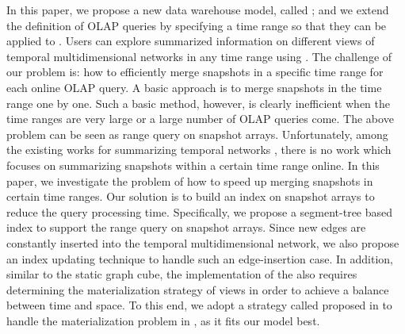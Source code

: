 \documentclass[10pt,journal,compsoc]{IEEEtran}
\begin{document}
In this paper, we propose a new data warehouse model, called   ; and we extend the definition of OLAP queries by specifying a time range so that they can be applied to   . Users can explore summarized information on different views of temporal multidimensional networks in any time range using   . The challenge of our problem is: how to efficiently merge snapshots in a specific time range for each online OLAP query. A basic approach is to merge snapshots in the time range one by one. Such a basic method, however, is clearly inefficient when the time ranges are very large or a large number of OLAP queries come. The above problem can be seen as range query on snapshot arrays. Unfortunately, among the existing works for summarizing temporal networks \cite{liu2018graph}, there is no work which focuses on summarizing snapshots within a certain time range online. In this paper, we investigate the problem of how to speed up merging snapshots in certain time ranges. Our solution is to build an index on snapshot arrays to reduce the query processing time. Specifically, we propose a segment-tree based index to support the range query on snapshot arrays. Since new edges are constantly inserted into the temporal multidimensional network, we also propose an index updating technique to handle such an edge-insertion case. In addition, similar to the static graph cube, the implementation of the    also requires determining the materialization strategy of views in order to achieve a balance between time and space. To this end, we adopt a strategy called  proposed in \cite{zhao2011graph} to handle the materialization problem in   , as it fits our model best.
\end{document}
